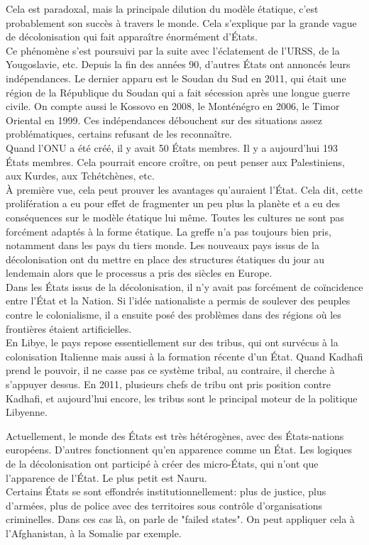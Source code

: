 \documentclass[10pt, a4paper, openany]{book}
\begin{document}
Cela est paradoxal, mais la principale dilution du modèle étatique, c'est probablement son succès à travers le monde. Cela s'explique par la grande vague de décolonisation qui fait apparaître énormément d'États. \\
Ce phénomène s'est poursuivi par la suite avec l'éclatement de l'URSS, de la Yougoslavie, etc. Depuis la fin des années 90, d'autres États ont annoncés leurs indépendances. Le dernier apparu est le Soudan du Sud en 2011, qui était une région de la République du Soudan qui a fait sécession après une longue guerre civile. On compte aussi le Kossovo en 2008, le Monténégro en 2006, le Timor Oriental en 1999. Ces indépendances débouchent sur des situations assez problématiques, certains refusant de les reconnaître. \\
Quand l'ONU a été créé, il y avait 50 États membres. Il y a aujourd'hui 193 États membres. Cela pourrait encore croître, on peut penser aux Palestiniens, aux Kurdes, aux Tchétchènes, etc. \\
À première vue, cela peut prouver les avantages qu'auraient l'État. Cela dit, cette prolifération a eu pour effet de fragmenter un peu plus la planète et a eu des conséquences sur le modèle étatique lui même. Toutes les cultures ne sont pas forcément adaptés à la forme étatique. La greffe n'a pas toujours bien pris, notamment dans les pays du tiers monde. Les nouveaux pays issus de la décolonisation ont du mettre en place des structures étatiques du jour au lendemain alors que le processus a pris des siècles en Europe. \\
Dans les États issus de la décolonisation, il n'y avait pas forcément de coïncidence entre l'État et la Nation. Si l'idée nationaliste a permis de soulever des peuples contre le colonialisme, il a ensuite posé des problèmes dans des régions où les frontières étaient artificielles. \\
En Libye, le pays repose essentiellement sur des tribus, qui ont survécus à la colonisation Italienne mais aussi à la formation récente d'un État. Quand Kadhafi prend le pouvoir, il ne casse pas ce système tribal, au contraire, il cherche à s'appuyer dessus. En 2011, plusieurs chefs de tribu ont pris position contre Kadhafi, et aujourd'hui encore, les tribus sont le principal moteur de la politique Libyenne.


Actuellement, le monde des États est très hétérogènes, avec des États-nations européens. D'autres fonctionnent qu'en apparence comme un État. Les logiques de la décolonisation ont participé à créer des micro-États, qui n'ont que l'apparence de l'État. Le plus petit est Nauru. \\
Certains États se sont effondrés institutionnellement: plus de justice, plus d'armées, plus de police avec des territoires sous contrôle d'organisations criminelles. Dans ces cas là, on parle de "failed states". On peut appliquer cela à l'Afghanistan, à la Somalie par exemple. 
\end{document}
